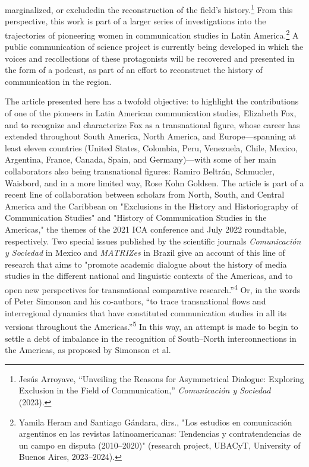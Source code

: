 \documentclass{tufte-handout}
\begin{document}
marginalized, or excludedin the reconstruction of the field's
history.\footnote{Jesús Arroyave, ``Unveiling the Reasons for
  Asymmetrical Dialogue: Exploring Exclusion in the Field of
  Communication,'' \emph{Comunicación y Sociedad} (2023).} From this
perspective, this work is part of a larger series of investigations into
the trajectories of pioneering women in communication studies in Latin
America.\footnote{Yamila Heram and Santiago Gándara, dirs., "Los
  estudios en comunicación argentinos en las revistas latinoamericanas:
  Tendencias y contratendencias de un campo en disputa (2010--2020)"
  (research project, UBACyT, University of Buenos Aires, 2023--2024).} A
public communication of science project is currently being developed in
which the voices and recollections of these protagonists will be
recovered and presented in the form of a podcast, as part of an effort
to reconstruct the history of communication in the region.

The article presented here has a twofold objective: to highlight the
contributions of one of the pioneers in Latin American communication
studies, Elizabeth Fox, and to recognize and characterize Fox as a
transnational figure, whose career has extended throughout South
America, North America, and Europe---spanning at least eleven countries
(United States, Colombia, Peru, Venezuela, Chile, Mexico, Argentina,
France, Canada, Spain, and Germany)---with some of her main
collaborators also being transnational figures: Ramiro Beltrán,
Schmucler, Waisbord, and in a more limited way, Rose Kohn Goldsen. The
article is part of a recent line of collaboration between scholars from
North, South, and Central America and the Caribbean on "Exclusions in
the History and Historiography of Communication Studies" and "History of
Communication Studies in the Americas," the themes of the 2021 ICA
conference and July 2022 roundtable, respectively. Two special issues
published by the scientific journals \emph{Comunicación y Sociedad} in
Mexico and \emph{MATRIZes} in Brazil give an account of this line of
research that aims to "promote academic dialogue about the history of
media studies in the different national and linguistic contexts of the
Americas, and to open new perspectives for transnational comparative
research.''\textsuperscript{4} Or, in the words of Peter Simonson and his co-authors,
``to trace transnational flows and interregional dynamics that have
constituted communication studies in all its versions throughout the
Americas.''\textsuperscript{5} In this
way, an attempt is made to begin to settle a debt of imbalance in the
recognition of South--North interconnections in the Americas, as
proposed by Simonson et al.
\end{document}
